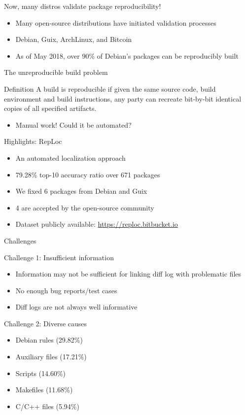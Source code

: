 \documentclass{beamer}
\begin{document}
\begin{frame}{Now, many distros validate package reproducibility!}
\begin{itemize}
\item Many open-source distributions have initiated validation processes
\item Debian, Guix, ArchLinux, and Bitcoin
\item As of May 2018, over 90\% of Debian's packages can be reproducibly built
\end{itemize}
\end{frame}

\begin{frame}{The unreproducible build problem}
\begin{block}{Definition}
A build is reproducible if given the same source code, build environment and build instructions, any party can recreate bit-by-bit identical copies of all specified artifacts.
\end{block}
\begin{itemize}
\item Manual work! Could it be automated?
\end{itemize}
\end{frame}

\begin{frame}{Highlights: RepLoc}
\begin{itemize}
\item An automated localization approach
\item 79.28\% top-10 accuracy ratio over 671 packages
\item We fixed 6 packages from Debian and Guix
\item 4 are accepted by the open-source community
\item Dataset publicly available: \url{https://reploc.bitbucket.io}
\end{itemize}
\end{frame}

\begin{frame}{Challenges}
\begin{block}{Challenge 1: Insufficient information}
\begin{itemize}
\item Information may not be sufficient for linking diff log with problematic files
\item No enough bug reports/test cases
\item Diff logs are not always well informative
\end{itemize}
\end{block}

\begin{block}{Challenge 2: Diverse causes}
\begin{itemize}
\item Debian rules (29.82\%) 
\item Auxiliary files (17.21\%)
\item Scripts (14.60\%)
\item Makefiles (11.68\%)
\item C/C++ files (5.94\%)
\end{itemize}
\end{block}
\end{frame}
\end{document}
